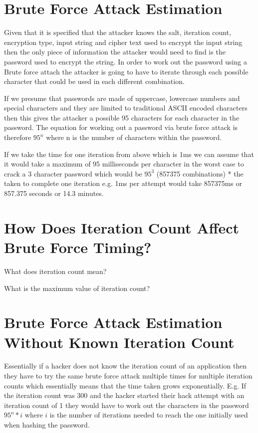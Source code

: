 \documentclass[a4paper, twoside, 11pt]{article}
\begin{document}
\section{Brute Force Attack Estimation}
Given that it is specified that the attacker knows the salt, iteration count, encryption type, 
input string and cipher text used to encrypt the input string then the only piece of information 
the attacker would need to find is the password used to encrypt the string. 
In order to work out the password using a Brute force attach the attacker is going to have to 
iterate through each possible character that could be used in each different combination.

If we presume that passwords are made of uppercase, lowercase numbers and special characters and they are
limited to traditional ASCII encoded characters then this gives the attacker a possible 95 characters for each character in the password.
The equation for working out a password via brute force attack is therefore $95^n$ where n is the number of characters within the password.

If we take the time for one iteration from above which is 1ms we can assume that it would take a maximum of 95 milliseconds per character in the worst case to crack a 3 character password which would be $95^3$ (857375 combinations) * the taken to complete one iteration e.g. 1ms per attempt would take 857375ms or 857.375 seconds or 14.3 minutes.  

\section{How Does Iteration Count Affect Brute Force Timing?}
What does iteration count mean?

What is the maximum value of iteration count?

\section{Brute Force Attack Estimation Without Known Iteration Count}
Essentially if a hacker does not know the iteration count of an application then they have to try the same brute
force attack multiple times for multiple iteration counts which essentially means that the time taken grows exponentially.
E.g. If the iteration count was 300 and the hacker started their hack attempt with an iteration count of 1 they would have
to work out the characters in the password $95^n*i$ where $i$ is the number of iterations needed to reach the one initially
used when hashing the password.
\end{document}

